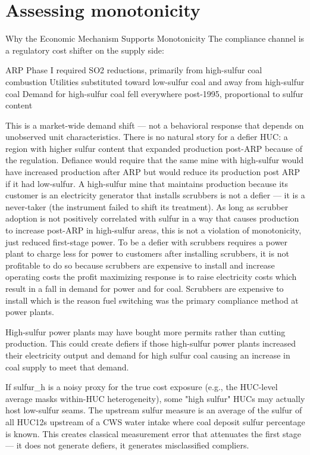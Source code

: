 \documentclass{article}
\begin{document}
\section{Assessing monotonicity}

Why the Economic Mechanism Supports Monotonicity
The compliance channel is a regulatory cost shifter on the supply side:

ARP Phase I required SO2 reductions, primarily from high-sulfur coal combustion
Utilities substituted toward low-sulfur coal and away from high-sulfur coal
Demand for high-sulfur coal fell everywhere post-1995, proportional to sulfur content

This is a market-wide demand shift — not a behavioral response that depends on unobserved unit characteristics. There is no natural story for a defier HUC: a region with higher sulfur content that expanded production post-ARP because of the regulation. Defiance would require that the same mine with high-sulfur would have increased production after ARP but would reduce its production post ARP if it had low-sulfur. A high-sulfur mine that maintains production because its customer is an electricity generator that installs scrubbers is not a defier — it is a never-taker (the instrument failed to shift its treatment). As long as scrubber adoption is not positively correlated with sulfur in a way that causes production to increase post-ARP in high-sulfur areas, this is not a violation of monotonicity, just reduced first-stage power. To be a defier with scrubbers requires a power plant to charge less for power to customers after installing scrubbers, it is not profitable to do so because scrubbers are expensive to install and increase operating costs the profit maximizing response is to raise electricity costs which result in a fall in demand for power and for coal. Scrubbers are expensive to install which is the reason fuel switching was the primary compliance method at power plants.

High-sulfur power plants may have bought more permits rather than cutting production. This could create defiers if those high-sulfur power plants increased their electricity output and demand for high sulfur coal causing an increase in coal supply to meet that demand.

If sulfur_h is a noisy proxy for the true cost exposure (e.g., the HUC-level average masks within-HUC heterogeneity), some "high sulfur" HUCs may actually host low-sulfur seams. The upstream sulfur measure is an average of the sulfur of all HUC12s upstream of a CWS water intake where coal deposit sulfur percentage is known. This creates classical measurement error that attenuates the first stage — it does not generate defiers, it generates misclassified compliers.
\end{document}
